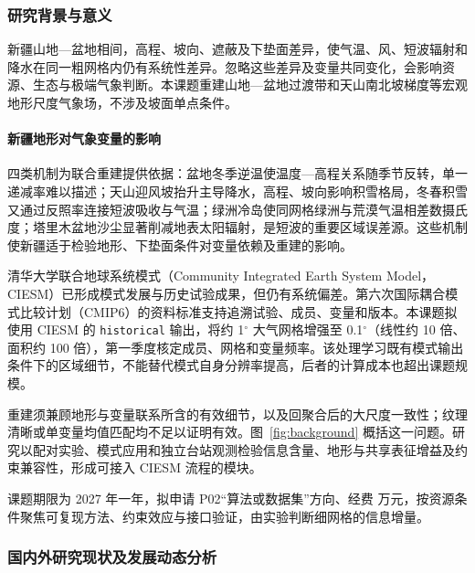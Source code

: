 \subsubsection{研究背景与意义}

新疆山地—盆地相间，高程、坡向、遮蔽及下垫面差异，使气温、风、短波辐射和降水在同一粗网格内仍有系统性差异。忽略这些差异及变量共同变化，会影响资源、生态与极端气象判断。本课题重建山地—盆地过渡带和天山南北坡梯度等宏观地形尺度气象场，不涉及坡面单点条件。

\paragraph{新疆地形对气象变量的影响}
四类机制为联合重建提供依据：盆地冬季逆温使温度—高程关系随季节反转，单一递减率难以描述；天山迎风坡抬升主导降水，高程、坡向影响积雪格局\cite{Li2019TianshanSnow}，冬春积雪又通过反照率连接短波吸收与气温；绿洲冷岛使同网格绿洲与荒漠气温相差数摄氏度\cite{Hao2015Oasis}；塔里木盆地沙尘显著削减地表太阳辐射，是短波的重要区域误差源\cite{Li2020TaklimakanDust}。这些机制使新疆适于检验地形、下垫面条件对变量依赖及重建的影响。

清华大学联合地球系统模式（Community Integrated Earth System Model，CIESM）已形成模式发展与历史试验成果，但仍有系统偏差\cite{Lin2020CIESM}。第六次国际耦合模式比较计划（CMIP6）的资料标准支持追溯试验、成员、变量和版本\cite{Eyring2016CMIP6}。本课题拟使用 CIESM 的 \texttt{historical} 输出，将约 1$^{\circ}$ 大气网格增强至 0.1$^{\circ}$（线性约 10 倍、面积约 100 倍），第一季度核定成员、网格和变量频率。该处理学习既有模式输出条件下的区域细节，不能替代模式自身分辨率提高，后者的计算成本也超出课题规模。

重建须兼顾地形与变量联系所含的有效细节，以及回聚合后的大尺度一致性；纹理清晰或单变量均值匹配均不足以证明有效。图~\ref{fig:background} 概括这一问题。研究以配对实验、模式应用和独立台站观测检验信息含量、地形与共享表征增益及约束兼容性，形成可接入 CIESM 流程的模块。

课题期限为 2027 年一年，拟申请 P02“算法或数据集”方向、经费  万元，按资源条件聚焦可复现方法、约束效应与接口验证，由实验判断细网格的信息增量。

\subsubsection{国内外研究现状及发展动态分析}

